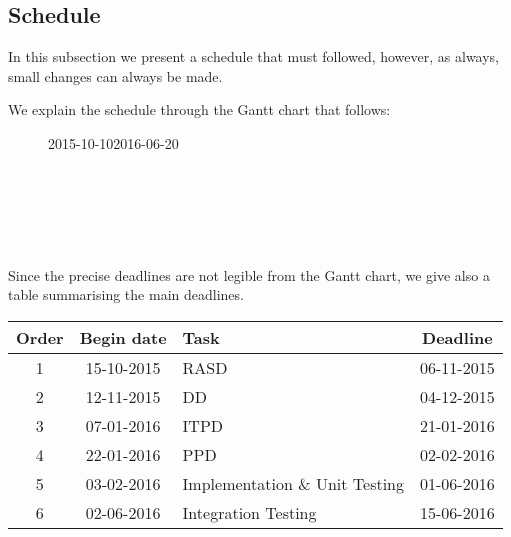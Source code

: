 \subsection{Schedule} %
\label{sub:schedule}

In this subsection we present a schedule that must followed, however, as always, small changes can always be made.

We explain the schedule through the Gantt chart that follows:

\begin{figure}[!h]
    \hspace*{-2.0cm}
    \begin{ganttchart}[
    		vgrid={*{6}{draw=none}, dotted},
    		hgrid={dotted},
    		time slot format=isodate,
			x unit=0.5mm,
			progress=today,
			progress label text={#1}\%,
	        today=2016-02-02,
	        today rule/.style= {gray!80, thick},
	        today label=Today,
	        today label/.style = {black},
	        link bulge=1, link tolerance=0,
    	]{2015-10-10}{2016-06-20}
         \\
         \\
         \\
         \\
         \\
         \\
    \end{ganttchart}
    \label{tab:gantt}
\end{figure}

Since the precise deadlines are not legible from the Gantt chart, we give also a table summarising the main deadlines.

\begin{center}
\begin{tabular}{ |c|c|l|c| } \hline
	\textbf{Order} & \textbf{Begin date} & \textbf{Task} & \textbf{Deadline} \\ \hline
	1 & 15-10-2015 & RASD & 06-11-2015 \\ \hline
	2 & 12-11-2015 & DD & 04-12-2015 \\ \hline
	3 & 07-01-2016 & ITPD & 21-01-2016 \\ \hline
	4 & 22-01-2016 & PPD & 02-02-2016 \\ \hline
	5 & 03-02-2016 & Implementation \& Unit Testing  & 01-06-2016 \\ \hline
	6 & 02-06-2016 & Integration Testing  & 15-06-2016 \\ \hline
\end{tabular}
\end{center}


